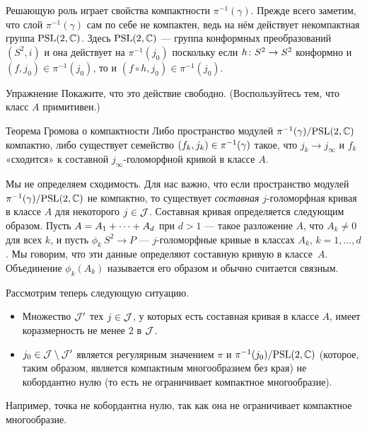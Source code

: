Решающую роль играет свойства компактности $\pi^{-1} (\gamma)$.
Прежде всего заметим, что слой $\pi^{-1} (\gamma)$ сам по себе не компактен, ведь на нём действует некомпактная группа $\mathrm{PSL}(2, \mathbb{C})$.
Здесь $\mathrm{PSL}(2, \mathbb{C})$ — группа конформных преобразований $(S^2, i)$ и она действует на $\pi^{-1} (j_0)$ поскольку
если $h\: S^2 \z\to S^2$ конформно и $(f, j_0) \in \pi^{-1} (j_0)$, то и $(f \circ h, j_0) \in \pi^{-1} (j_0)$.

\begin{ex*}{Упражнение}
Покажите, что это действие свободно.
(Воспользуйтесь тем, что класс $A$ примитивен.)
\end{ex*}

\begin{thm*}{Теорема Громова о компактности}
Либо пространство модулей $\pi^{-1} (\gamma)/\mathrm{PSL}(2, \mathbb{C})$ компактно, либо существует семейство $(f_k, j_k) \z\in \pi^{-1} (\gamma)$ такое, что $j_k \to j_\infty$ и $f_k$ «сходится» к составной $j_\infty$-голоморфной кривой в классе $A$.
\end{thm*}

Мы не определяем сходимость.
Для нас важно, что если пространство модулей $\pi^{-1} (\gamma)/\mathrm{PSL}(2, \mathbb{C})$ не компактно, то существует \emph{составная} $j$-голоморфная кривая в классе $A$ для некоторого $j \in \mathcal{J}$.
Составная кривая определяется следующим образом.
Пусть $A \z= A_1 +\dots+ A_d$ при $d > 1$ — такое разложение $A$, что $A_k \ne 0$ для всех $k$, и пусть $\phi_k \: S^2 \to P$ — $j$-голоморфные кривые в классах $A_k$, $k = 1,\dots,d$.
Мы говорим, что эти данные определяют составную кривую в классе~$A$.
Объединение $\phi_k (A_k)$ называется его образом и обычно считается связным.

Рассмотрим теперь следующую ситуацию.
\begin{itemize}
\item Множество $\mathcal{J}'$ тех $j \in \mathcal{J}$, у которых есть составная кривая в классе $A$, имеет коразмерность не менее $2$ в $\mathcal{J}$.

\item $j_0 \in \mathcal{J}\setminus \mathcal{J}'$ является регулярным значением $\pi$ и $\pi^{-1} (j_0)/\mathrm{PSL}(2, \mathbb{C})$ (которое, таким образом, является компактным многообразием без края) не кобордантно нулю (то есть не ограничивает компактное многообразие).
 
\end{itemize}
Например, точка не кобордантна нулю, так как она не ограничивает компактное многообразие.

